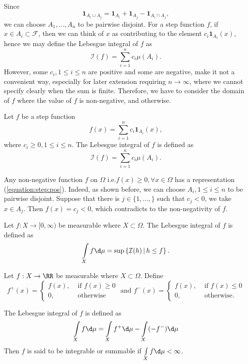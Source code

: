 Since
$$\mathbf{1}_{A_i\cup A_j} = \mathbf{1}_{A_i} + \mathbf{1}_{A_j} - \mathbf{1}_{A_i\cap A_j},$$
we can choose $A_1,...,A_n$ to be pairwise disjoint. For a step function $f$, if $x\in A_i\subset\mathcal{F}$, then we can think of $x$ as contributing to the element $c_i\mathbf{1}_{A_i}(x)$, hence we may define the Lebesgue integral of $f$ as
$$\mathcal{I}(f)=\sum\limits_{i=1}^nc_i\mu(A_i).$$
However, some $c_i, 1\le i\le n$ are positive and some are negative, make it not a convenient way, especially for later extension requiring $n\to\infty$, where we cannot specify clearly when the sum is finite. Therefore, we have to consider the domain of $f$ where the value of $f$ is non-negative, and otherwise.

\begin{definition}
    Let $f$ be a step function
    \begin{equation}
        \label{equation:step:pos}
        f(x)=\sum\limits_{i=1}^nc_i\mathbf{1}_{A_i}(x),
    \end{equation}
    where $c_i\ge0, 1\le i\le n$. The Lebesgue integral of $f$ is defined as
    $$\mathcal{I}(f)=\sum\limits_{i=1}^nc_i\mu(A_i).$$
\end{definition}

Any non-negative function $f$ on $\Omega$ i.e.$f(x)\ge 0,\forall x\in\Omega$ has a representation (\ref{equation:step:pos}). Indeed, as shown before, we can choose $A_i, 1\le i\le n$ to be pairwise disjoint. Suppose that there is $j\in\{1,...,\}$ such that $c_j<0$, we take $x\in A_j$. Then $f(x)=c_j<0$, which contradicts to the non-negativity of $f$.

\begin{definition}
    Let $f:X\to[0,\infty)$ be measurable where $X\subset\Omega$. The Lebesgue integral of $f$ is defined as
    \begin{equation}
        \int\limits_{X}f\d \mu = \sup\left\{\mathcal{I}(h)\,|\, h\le f\right\}.
    \end{equation}
\end{definition}

\begin{definition}
    Let $f:X\to\RR$ be measurable where $X\subset\Omega$. Define
    $$f^+(x)=\begin{cases}
            f(x), & \text{ if } f(x)\ge 0 \\
            0,    & \text{ otherwise}
        \end{cases} \text{ and } f^-(x)=\begin{cases}
            f(x), & \text{ if } f(x)\le 0 \\
            0,    & \text{ otherwise.}
        \end{cases}$$

    The Lebesgue integral of $f$ is defined as
    \begin{equation}
        \int\limits_{X}f\d \mu = \int\limits_{X}f^+\d \mu - \int\limits_{X}(-f^-)\d \mu
    \end{equation}
    Then $f$ is said to be integrable or summable if $\int\limits_{X}f\d \mu<\infty$.
\end{definition}

